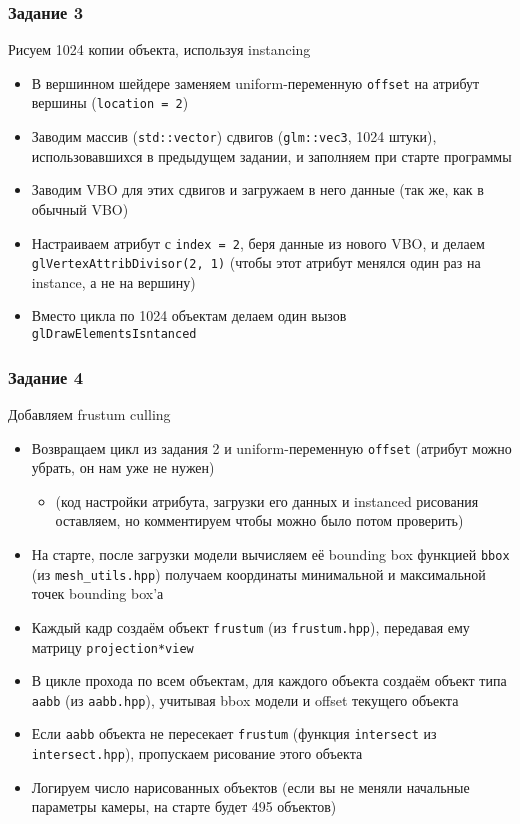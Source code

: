 \documentclass{beamer}
\begin{document}
\begin{frame}[fragile]
\frametitle{Задание 3}
Рисуем 1024 копии объекта, используя instancing
\begin{itemize}
\item В вершинном шейдере заменяем uniform-переменную \verb|offset| на атрибут вершины (\verb|location = 2|)
\pause
\item Заводим массив (\verb|std::vector|) сдвигов (\verb|glm::vec3|, 1024 штуки), использовавшихся в предыдущем задании, и заполняем при старте программы
\pause
\item Заводим VBO для этих сдвигов и загружаем в него данные (так же, как в обычный VBO)
\pause
\item Настраиваем атрибут с \verb|index = 2|, беря данные из нового VBO, и делаем \verb|glVertexAttribDivisor(2, 1)| (чтобы этот атрибут менялся один раз на instance, а не на вершину)
\pause
\item Вместо цикла по 1024 объектам делаем один вызов \verb|glDrawElementsIsntanced|
\end{itemize}
\end{frame}

\begin{frame}[fragile]
\fontsize{10pt}{10pt}
\frametitle{Задание 4}
Добавляем frustum culling
\begin{itemize}
\item Возвращаем цикл из задания 2 и uniform-переменную \verb|offset| (атрибут можно убрать, он нам уже не нужен)
\begin{itemize}
\item (код настройки атрибута, загрузки его данных и instanced рисования оставляем, но комментируем \textendash{} чтобы можно было потом проверить)
\end{itemize}
\pause
\item На старте, после загрузки модели вычисляем её bounding box функцией \verb|bbox| (из \verb|mesh_utils.hpp|) \textendash{} получаем координаты минимальной и максимальной точек bounding box'а
\pause
\item Каждый кадр создаём объект \verb|frustum| (из \verb|frustum.hpp|), передавая ему матрицу \verb|projection*view|
\pause
\item В цикле прохода по всем объектам, для каждого объекта создаём объект типа \verb|aabb| (из \verb|aabb.hpp|), учитывая bbox модели и offset текущего объекта
\pause
\item Если \verb|aabb| объекта не пересекает \verb|frustum| (функция \verb|intersect| из \verb|intersect.hpp|), пропускаем рисование этого объекта
\pause
\item Логируем число нарисованных объектов (если вы не меняли начальные параметры камеры, на старте будет 495 объектов)
\end{itemize}
\end{frame}
\end{document}
